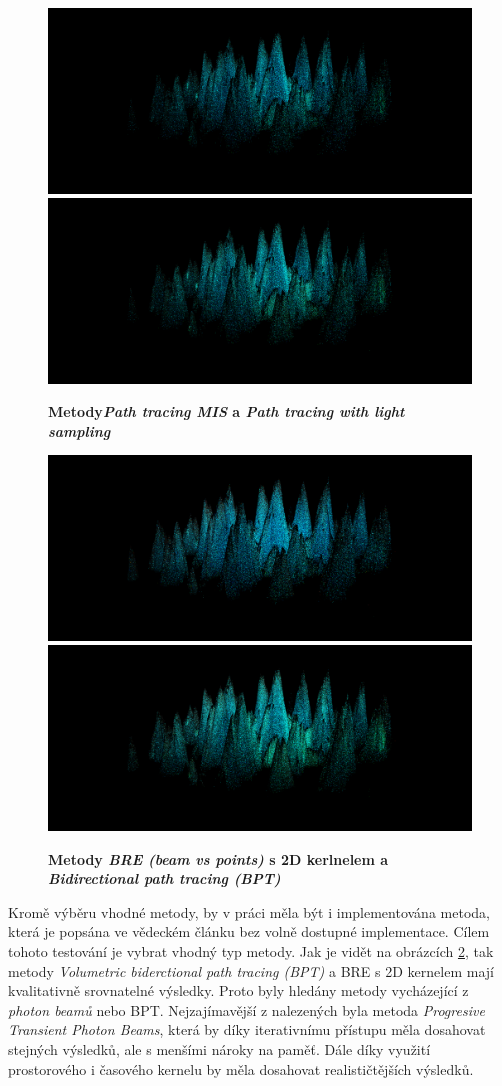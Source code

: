 \begin{figure}[H]\centering
\includegraphics[width=0.5\linewidth]{obrazky-figures/reference_upbp_ptmis_3600.png}\hfill
\includegraphics[width=0.5\linewidth]{obrazky-figures/reference_upbp_ptls_3600.png}\hfill
  \caption{\textbf{Metody\textit{Path tracing MIS} a \textit{Path tracing with light sampling}}}
  \label{porovnani3}
\end{figure}
\begin{figure}[H]\centering
\includegraphics[width=0.5\linewidth]{obrazky-figures/reference_upbp_pb2d_3600.png}\hfill
\includegraphics[width=0.5\linewidth]{obrazky-figures/reference_upbp_bpt_3600.png}\hfill
  \caption{\textbf{Metody \textit{BRE (beam vs points)} s 2D kerlnelem a \textit{Bidirectional path tracing (BPT)}}}
  \label{porovnani4}
\end{figure}
\newpage
Kromě výběru vhodné metody, by v práci měla být i implementována metoda, která je popsána ve vědeckém článku bez volně dostupné implementace. Cílem tohoto testování je vybrat vhodný typ metody. Jak je vidět na obrázcích \ref{porovnani4}, tak metody \textit{Volumetric biderctional path tracing (BPT)} a BRE s 2D kernelem mají kvalitativně srovnatelné výsledky. Proto byly hledány metody vycházející z \textit{photon beamů} nebo BPT. Nejzajímavější z nalezených byla metoda \textit{Progresive Transient Photon Beams}\cite{ptpb}, která by díky iterativnímu přístupu měla dosahovat stejných výsledků, ale s menšími nároky na paměť. Dále díky využití prostorového i časového kernelu by měla dosahovat realističtějších výsledků.  

